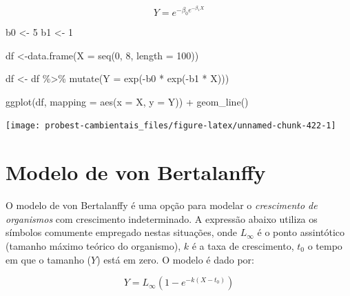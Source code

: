 \documentclass[
]{book}
\newenvironment{Shaded}{\begin{snugshade}}{\end{snugshade}}
\newcommand{\AttributeTok}[1]{\textcolor[rgb]{0.77,0.63,0.00}{#1}}
\newcommand{\DecValTok}[1]{\textcolor[rgb]{0.00,0.00,0.81}{#1}}
\newcommand{\FunctionTok}[1]{\textcolor[rgb]{0.00,0.00,0.00}{#1}}
\newcommand{\NormalTok}[1]{#1}
\newcommand{\OtherTok}[1]{\textcolor[rgb]{0.56,0.35,0.01}{#1}}
\newcommand{\SpecialCharTok}[1]{\textcolor[rgb]{0.00,0.00,0.00}{#1}}
\begin{document}
\[Y = e^{-\beta_0 e^{-\beta_1 X}}\]

\begin{Shaded}
\begin{Highlighting}[]
\NormalTok{b0 }\OtherTok{\textless{}{-}} \DecValTok{5}
\NormalTok{b1 }\OtherTok{\textless{}{-}} \DecValTok{1}

\NormalTok{df }\OtherTok{\textless{}{-}}\FunctionTok{data.frame}\NormalTok{(}\AttributeTok{X =} \FunctionTok{seq}\NormalTok{(}\DecValTok{0}\NormalTok{, }\DecValTok{8}\NormalTok{, }\AttributeTok{length =} \DecValTok{100}\NormalTok{))}

\NormalTok{df }\OtherTok{\textless{}{-}}\NormalTok{ df }\SpecialCharTok{\%\textgreater{}\%} \FunctionTok{mutate}\NormalTok{(}\AttributeTok{Y =} \FunctionTok{exp}\NormalTok{(}\SpecialCharTok{{-}}\NormalTok{b0 }\SpecialCharTok{*} \FunctionTok{exp}\NormalTok{(}\SpecialCharTok{{-}}\NormalTok{b1 }\SpecialCharTok{*}\NormalTok{ X)))}

\FunctionTok{ggplot}\NormalTok{(df, }\AttributeTok{mapping =} \FunctionTok{aes}\NormalTok{(}\AttributeTok{x =}\NormalTok{ X, }\AttributeTok{y =}\NormalTok{ Y)) }\SpecialCharTok{+}
  \FunctionTok{geom\_line}\NormalTok{()}
\end{Highlighting}
\end{Shaded}

\begin{center}\texttt{[image: probest-cambientais\_files/figure-latex/unnamed-chunk-422-1]} \end{center}

\hypertarget{modelo-de-von-bertalanffy}{%
\section{Modelo de von Bertalanffy}\label{modelo-de-von-bertalanffy}}

O modelo de von Bertalanffy é uma opção para modelar o \emph{crescimento de organismos} com crescimento indeterminado. A expressão abaixo utiliza os símbolos comumente empregado nestas situações, onde \(L_{\infty}\) é o ponto assintótico (tamanho máximo teórico do organismo), \(k\) é a taxa de crescimento, \(t_0\) o tempo em que o tamanho (\(Y\)) está em zero. O modelo é dado por:

\[Y = L_{\infty} (1 - e^{-k(X - t_0)})\]
\end{document}
